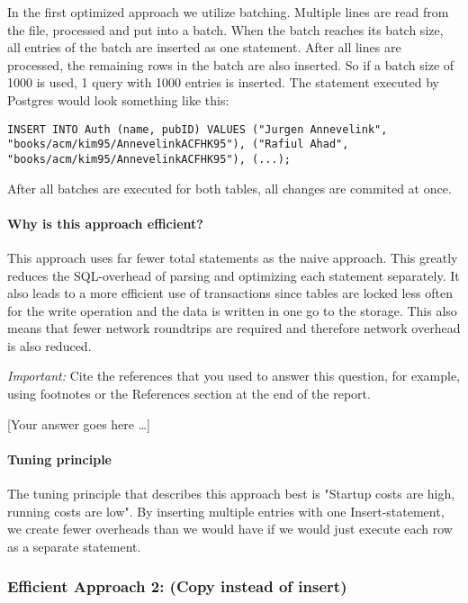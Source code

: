 \documentclass[11pt]{scrartcl}
\newcommand{\youranswerhere}{[Your answer goes here \ldots]}
\begin{document}
In the first optimized approach we utilize batching. Multiple lines are read from the file, processed and put into a batch. When the batch reaches its batch size, all entries of the batch are inserted as one statement. After all lines are processed, the remaining rows in the batch are also inserted. So if a batch size of 1000 is used, 1 query with 1000 entries is inserted. The statement executed by Postgres would look something like this:

\begin{lstlisting}[style=dbtsql]
INSERT INTO Auth (name, pubID) VALUES ("Jurgen Annevelink",
"books/acm/kim95/AnnevelinkACFHK95"), ("Rafiul Ahad", 
"books/acm/kim95/AnnevelinkACFHK95"), (...);
\end{lstlisting}

After all batches are executed for both tables, all changes are commited at once.

\paragraph{Why is this approach efficient?}

This approach uses far fewer total statements as the naive approach. This greatly reduces the SQL-overhead of parsing and optimizing each statement separately. It also leads to a more efficient use of transactions since tables are locked less often for the write operation and the data is written in one go to the storage. This also means that fewer network roundtrips are required and therefore network overhead is also reduced. 

\emph{Important:} Cite the references that you used to answer this question, for example, using footnotes or the References section at the end of the report.

\youranswerhere{}

\paragraph{Tuning principle}

The tuning principle that describes this approach best is "Startup costs are high, running costs are low". By inserting multiple entries with one Insert-statement, we create fewer overheads than we would have if we would just execute each row as a separate statement.

\subsubsection*{Efficient Approach 2: (Copy instead of insert)}
\end{document}
